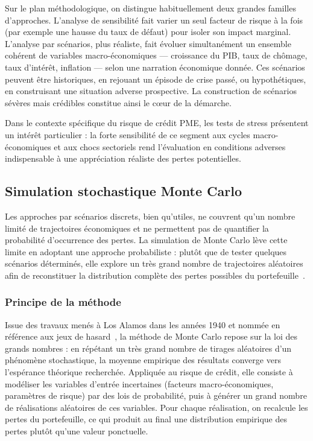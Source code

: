 \documentclass[a4paper,12pt,oneside]{report}
\begin{document}
Sur le plan méthodologique, on distingue habituellement deux grandes familles d'approches.
L'analyse de sensibilité fait varier un seul facteur de risque à la fois (par
exemple une hausse du taux de défaut) pour isoler son impact marginal. L'analyse par
scénarios, plus réaliste, fait évoluer simultanément un ensemble cohérent de variables
macro-économiques — croissance du PIB, taux de chômage, taux d'intérêt, inflation — selon une
narration économique donnée. Ces scénarios peuvent être historiques, en rejouant un
épisode de crise passé, ou hypothétiques, en construisant une situation adverse
prospective. La construction de scénarios sévères mais crédibles constitue ainsi le c\oe ur
de la démarche.

Dans le contexte spécifique du risque de crédit PME, les tests de stress présentent un intérêt
particulier : la forte sensibilité de ce segment aux cycles macro-économiques et aux chocs
sectoriels rend l'évaluation en conditions adverses indispensable à une appréciation réaliste
des pertes potentielles.

\subsection{Simulation stochastique Monte Carlo}

Les approches par scénarios discrets, bien qu'utiles, ne couvrent qu'un nombre limité de
trajectoires économiques et ne permettent pas de quantifier la probabilité d'occurrence des
pertes. La simulation de Monte Carlo lève cette limite en adoptant une approche probabiliste :
plutôt que de tester quelques scénarios déterminés, elle explore un très grand nombre de
trajectoires aléatoires afin de reconstituer la distribution complète des pertes possibles du
portefeuille~\cite{glasserman2004}.

\subsubsection{Principe de la méthode}

Issue des travaux menés à Los Alamos dans les années 1940 et nommée en référence aux jeux de
hasard~\cite{metropolis1949}, la méthode de Monte Carlo repose sur la loi des grands nombres :
en répétant un très grand nombre de tirages aléatoires d'un phénomène stochastique, la moyenne
empirique des résultats converge vers l'espérance théorique recherchée. Appliquée au risque de
crédit, elle consiste à modéliser les variables d'entrée incertaines (facteurs
macro-économiques, paramètres de risque) par des lois de probabilité, puis à générer un grand
nombre de réalisations aléatoires de ces variables. Pour chaque réalisation, on recalcule les
pertes du portefeuille, ce qui produit au final une distribution empirique des pertes plutôt
qu'une valeur ponctuelle.
\end{document}
